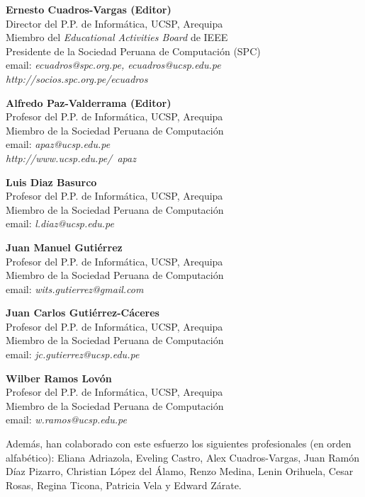
\begin{center}
\textbf{Ernesto Cuadros-Vargas (Editor)}\\
Director del P.P. de Informática, UCSP, Arequipa\\
Miembro del \textit{Educational Activities Board} de IEEE\\
Presidente de la Sociedad Peruana de Computación (SPC)\\
email: \textit{ecuadros@spc.org.pe, ecuadros@ucsp.edu.pe}\\
\textit{http://socios.spc.org.pe/ecuadros}
\end{center}

\begin{center}
\textbf{Alfredo Paz-Valderrama (Editor)}\\
Profesor del P.P. de Informática, UCSP, Arequipa\\
Miembro de la Sociedad Peruana de Computación\\
email: \textit{apaz@ucsp.edu.pe}\\
\textit{http://www.ucsp.edu.pe/~apaz}
\end{center}

\begin{center}
\textbf{Luis Diaz Basurco}\\
Profesor del P.P. de Informática, UCSP, Arequipa\\
Miembro de la Sociedad Peruana de Computación\\
email: \textit{l.diaz@ucsp.edu.pe}
\end{center}

\begin{center}
\textbf{Juan Manuel Gutiérrez}\\
Profesor del P.P. de Informática, UCSP, Arequipa\\
Miembro de la Sociedad Peruana de Computación\\
email: \textit{wits.gutierrez@gmail.com}
\end{center}


\begin{center}
\textbf{Juan Carlos Gutiérrez-Cáceres}\\
Profesor del P.P. de Informática, UCSP, Arequipa\\
Miembro de la Sociedad Peruana de Computación\\
email: \textit{jc.gutierrez@ucsp.edu.pe}
\end{center}

\begin{center}
\textbf{Wilber Ramos Lovón}\\
Profesor del P.P. de Informática, UCSP, Arequipa\\
Miembro de la Sociedad Peruana de Computación\\
email: \textit{w.ramos@ucsp.edu.pe}
\end{center}

Además, han colaborado con este esfuerzo los siguientes profesionales (en orden alfabético): Eliana Adriazola, Eveling Castro, Alex Cuadros-Vargas, Juan Ramón Díaz Pizarro, Christian López del Álamo, Renzo Medina, Lenin Orihuela, Cesar Rosas, Regina Ticona, Patricia Vela y Edward Zárate.
\newpage